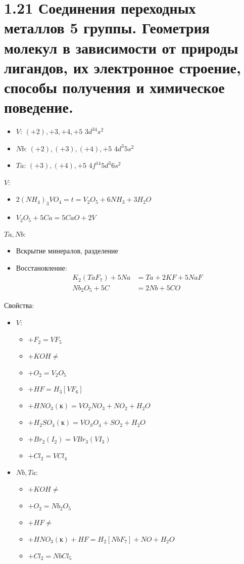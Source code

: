 \section*{1.21 Соединения переходных металлов 5 группы. Геометрия молекул в зависимости от природы лигандов, их электронное строение, способы получения и химическое поведение.}
\begin{itemize}
	\item $V$: $(+2), +3, +4, +5$ \quad $3d^34s^2$
	\item $Nb$: $(+2), (+3), (+4), +5$ \quad $4d^3 5s^2$
	\item $Ta$: $(+3), (+4), +5$ \quad $4f^{14} 5d^3 6s^2$
\end{itemize}
$V$:
\begin{itemize}
	\item $2(NH_4)_3VO_4 = t = V_2O_5 + 6 NH_3 + 3 H_2O$
	\item $V_2O_5 + 5 Ca = 5CaO + 2V$
\end{itemize}
$Ta, Nb$:
\begin{itemize}
	\item Вскрытие минералов, разделение
	\item Восстановление:
	\begin{align*}
		K_2(TaF_7) + 5 Na &= Ta + 2KF + 5 NaF \\
		Nb_2O_5 + 5C &= 2Nb + 5CO
	\end{align*}
\end{itemize}
Свойства:
\begin{itemize}
	\item $V$:
	\begin{itemize}
		\item $+ F_2 = VF_5$
		\item $+ KOH \not = $
		\item $+ O_2 = V_2O_5 $
		\item $+ HF = H_3\left[VF_6 \right] $
		\item $+ HNO_3(\text{к}) = VO_2NO_3 + NO_2 + H_2O$	
		\item $+ H_2SO_4 (\text{к}) = VO_SO_4 + SO_2 + H_2O  $
		\item $+ Br_2(I_2) = VBr_3(VI_3) $
		\item $+ Cl_2 = VCl_4 $	
	\end{itemize}
	\item $Nb, Ta$:
	\begin{itemize}
		\item $+ KOH \not = $
		\item $+ O_2 = Nb_2O_5 $
		\item $+ HF \not =  $
		\item $+ HNO_3(\text{к}) + HF = H_2\left[NbF_7 \right] + NO + H_2O $	
		\item $+ Cl_2 = NbCl_5 $		
	\end{itemize}
\end{itemize}
